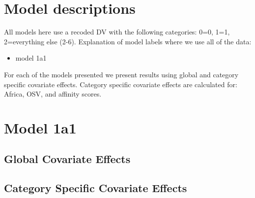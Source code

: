 \documentclass[]{article}
\begin{document}
\tableofcontents

\clearpage

\section{Model descriptions}

All models here use a recoded DV with the following categories: 0=0, 1=1, 2=everything else (2-6). Explanation of model labels where we use all of the data:

\begin{itemize}
	\item model 1a1
\end{itemize}

For each of the models presented we present results using global and category specific covariate effects. Category specific covariate effects are calculated for: Africa, OSV, and affinity scores.
\clearpage

\section{Model 1a1}
\subsection{Global Covariate Effects}

\clearpage
\subsection{Category Specific Covariate Effects}

\clearpage
\end{document}
